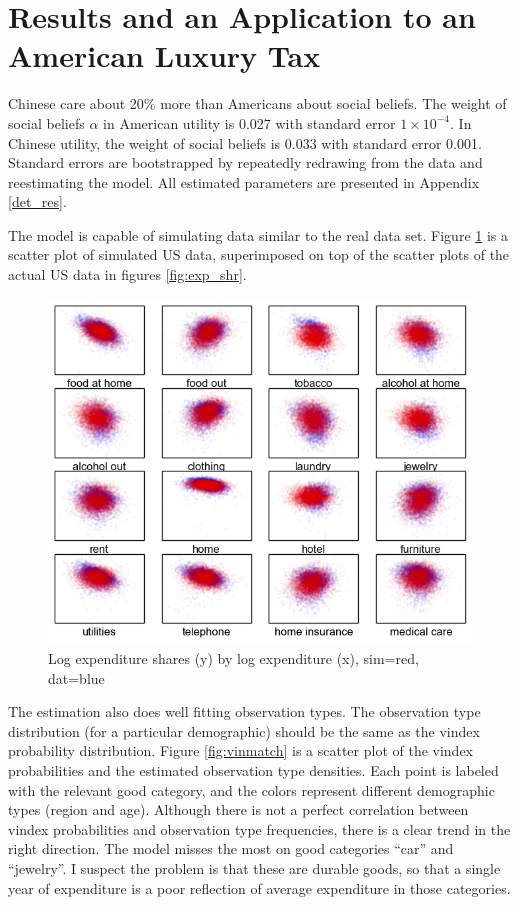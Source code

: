\documentclass[12pt]{article}
\begin{document}
\section{Results and an Application to an American Luxury Tax}
\label{sec:results}

Chinese care about 20\% more than Americans about social beliefs.  The weight of social beliefs $\alpha$ in American utility is 0.027 with standard error $1\times10^{-4}$.  In Chinese utility, the weight of social beliefs is 0.033 with standard error 0.001.  Standard errors are bootstrapped by repeatedly redrawing from the data and reestimating the model.  All estimated parameters are presented in Appendix \ref{det_res}.

The model is capable of simulating data similar to the real data set. Figure \ref{fig:shares_fake} is a scatter plot of simulated US data, superimposed on top of the scatter plots of the actual US data in figures \ref{fig:exp_shr}.
\begin{figure}
	\centering
		\includegraphics[scale=1]{pics/shr_plot_sim.png}
	\caption{Log expenditure shares (y) by log expenditure (x), sim=red, dat=blue}
	\label{fig:shares_fake}
\end{figure}
The estimation also does well fitting observation types.
The observation type distribution (for a particular demographic) should be the same as the vindex probability distribution.
Figure \ref{fig:vinmatch} is a scatter plot of the vindex probabilities and the estimated observation type densities.  Each point is labeled with the relevant good category, and the colors represent different demographic types (region and age). Although there is not a perfect correlation between vindex probabilities and observation type frequencies, there is a clear trend in the right direction.  The model misses the most on good categories ``car'' and ``jewelry''.  I suspect the problem is that these are durable goods, so that a single year of expenditure is a poor reflection of average expenditure in those categories.
\end{document}
